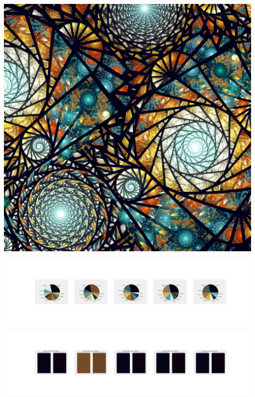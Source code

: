 \documentclass[11pt]{article}
\begin{document}
\begin{landscape}
    \begin{center}
    \includegraphics[width=\textwidth]{./nbimg/file (370).jpg}
    \end{center}

    \begin{center}
    \includegraphics[width=250mm]{./nbimg/pie-301.jpg}
    \end{center}

    \begin{center}
    \includegraphics[width=250mm]{./nbimg/peak-301.jpg}
    \end{center}
    


\end{landscape}
\end{document}
